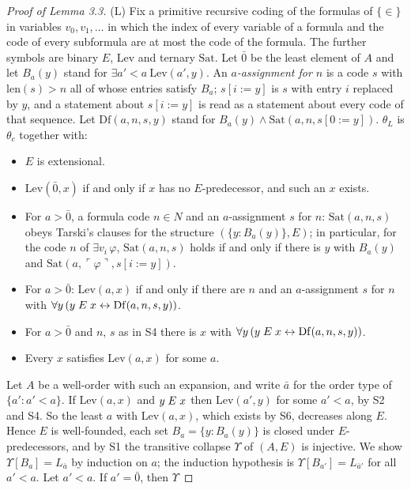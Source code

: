 \documentclass[11pt]{article}
\begin{document}
\begin{proof}[Proof of Lemma 3.3]
(L) Fix a primitive recursive coding of the formulas of $\{\in\}$ in variables $v_0, v_1, \dots$ in which the
index of every variable of a formula and the code of every subformula are at most the code of the formula. The further
symbols are binary $E$, $\mathrm{Lev}$ and ternary $\mathrm{Sat}$. Let $\bar 0$ be the least element of $A$ and let
$B_a(y)$ stand for $\exists a' < a\ \mathrm{Lev}(a', y)$. An \emph{$a$-assignment for $n$} is a code $s$ with
$\mathrm{len}(s) > n$ all of whose entries satisfy $B_a$; $s[i{:=}y]$ is $s$ with entry $i$ replaced by $y$, and a statement about $s[i{:=}y]$ is read as a statement about
every code of that sequence. Let
$\mathrm{Df}(a, n, s, y)$ stand for $B_a(y) \wedge \mathrm{Sat}(a, n, s[0{:=}y])$. $\theta_L$ is $\theta_c$ together with:
\begin{itemize}
\item[S1.] $E$ is extensional.
\item[S2.] $\mathrm{Lev}(\bar 0, x)$ if and only if $x$ has no $E$-predecessor, and such an $x$ exists.
\item[S3.] For $a > \bar 0$, a formula code $n \in N$ and an $a$-assignment $s$ for $n$: $\mathrm{Sat}(a, n, s)$
  obeys Tarski's clauses for the structure $(\{y : B_a(y)\}, E)$; in particular, for the code $n$ of
  $\exists v_i\, \varphi$, $\mathrm{Sat}(a, n, s)$ holds if and only if there is $y$ with $B_a(y)$ and
  $\mathrm{Sat}(a, \ulcorner\varphi\urcorner, s[i{:=}y])$.
\item[S4.] For $a > \bar 0$: $\mathrm{Lev}(a, x)$ if and only if there are $n$ and an $a$-assignment $s$ for $n$
  with $\forall y\, (y \mathrel{E} x \leftrightarrow \mathrm{Df}(a, n, s, y))$.
\item[S5.] For $a > \bar 0$ and $n$, $s$ as in S4 there is $x$ with $\forall y\, (y \mathrel{E} x \leftrightarrow \mathrm{Df}(a, n, s, y))$.
\item[S6.] Every $x$ satisfies $\mathrm{Lev}(a, x)$ for some $a$.
\end{itemize}
Let $A$ be a well-order with such an expansion, and write $\bar a$ for the order type of $\{a' : a' < a\}$. If
$\mathrm{Lev}(a, x)$ and $y \mathrel{E} x$ then $\mathrm{Lev}(a', y)$ for some $a' < a$, by S2 and S4. So the least $a$ with
$\mathrm{Lev}(a, x)$, which exists by S6, decreases along $E$. Hence $E$ is well-founded, each set
$B_a = \{y : B_a(y)\}$ is closed under $E$-predecessors, and by S1 the transitive collapse $\Upsilon$ of $(A, E)$ is
injective. We show $\Upsilon[B_a] = L_{\bar a}$ by induction on $a$; the induction hypothesis is
$\Upsilon[B_{a'}] = L_{\bar a'}$ for all $a' < a$. Let $a' < a$. If $a' = \bar 0$, then $\Upsilon$

\end{proof}
\end{document}
